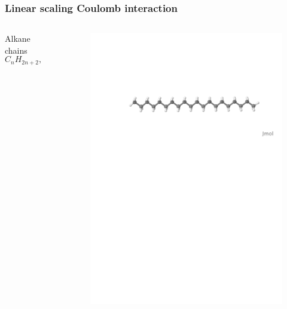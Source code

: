 \documentclass[mathserif]{beamer}
\begin{document}
\begin{frame}
    \frametitle{Linear scaling Coulomb interaction}
    \begin{columns}
    \begin{column}{.40\textwidth}
    Alkane chains
    \begin{equation}
	\nonumber
	C_{n}H_{2n+2}, \qquad n=2,\dots,70
    \end{equation}
    \end{column}
    \begin{column}{.60\textwidth}
	\begin{figure}
	    \includegraphics[scale=0.3, clip, viewport = 80 560 600 720]{figures/alkane.pdf}
	\end{figure}
    \end{column}
    \end{columns}    
    \ \\

\end{frame}
\end{document}
